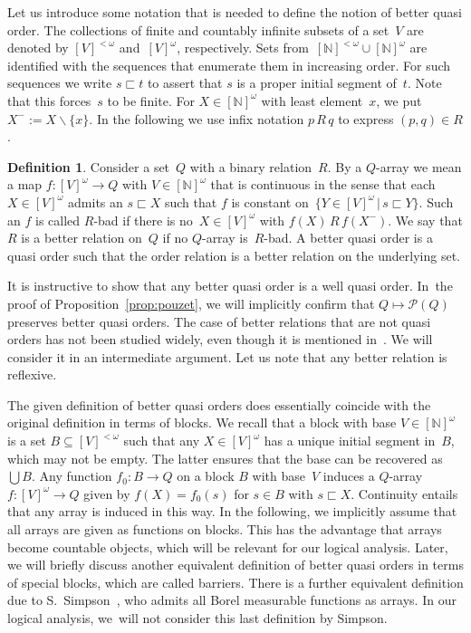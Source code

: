 \documentclass{amsart}
\numberwithin{theorem}{section}
\theoremstyle{definition}
\newtheorem{definition}[theorem]{Definition}
\begin{document}
Let us introduce some notation that is needed to define the notion of better quasi order. The collections of finite and countably infinite subsets of a set~$V$ are denoted by $[V]^{<\omega}$ and~$[V]^\omega$, respectively. Sets from~$[\mathbb N]^{<\omega}\cup[\mathbb N]^\omega$ are identified with the sequences that enumerate them in increasing order. For such sequences we write $s\sqsubset t$ to assert that $s$ is a proper initial segment of~$t$. Note that this forces~$s$ to be finite. For $X\in[\mathbb N]^\omega$ with least element~$x$, we put $X^-:=X\backslash\{x\}$. In the following we use infix notation $p\,R\,q$ to express $(p,q)\in R$.

\begin{definition}
Consider a set~$Q$ with a binary relation~$R$. By a $Q$-array we mean a map $f:[V]^\omega\to Q$ with $V\in[\mathbb N]^\omega$ that is continuous in the sense that each~$X\in[V]^\omega$ admits an $s\sqsubset X$ such that $f$ is constant on~$\{Y\in[V]^\omega\,|\,s\sqsubset Y\}$. Such an $f$ is called $R$-bad if there is no~$X\in[V]^\omega$ with $f(X)\,R\,f(X^-)$. We say that $R$ is a better relation on~$Q$ if no $Q$-array is~$R$-bad. A better quasi order is a quasi order such that the order relation is a better relation on the underlying set.
\end{definition}

It is instructive to show that any better quasi order is a well quasi order. In~the proof of Proposition~\ref{prop:pouzet}, we will implicitly confirm that $Q\mapsto\mathcal P(Q)$ preserves better quasi orders. The case of better relations that are not quasi orders has not been studied widely, even though it is mentioned in~\cite{pouzet-better-relation,shelah-bqo}. We will consider it in an intermediate argument. Let us note that any better relation is reflexive.

The given definition of better quasi orders does essentially coincide with the original definition in terms of blocks. We recall that a block with base $V\in[\mathbb N]^\omega$ is a set $B\subseteq[V]^{<\omega}$ such that any $X\in[V]^\omega$ has a unique initial segment in~$B$, which may not be empty. The latter ensures that the base can be recovered as $\bigcup B$. Any function $f_0:B\to Q$ on a block $B$ with base~$V$ induces a $Q$-array $f:[V]^\omega\to Q$ given by $f(X)=f_0(s)$ for $s\in B$ with $s\sqsubset X$. Continuity entails that any array is induced in this way. In the following, we implicitly assume that all arrays are given as functions on blocks. This has the advantage that arrays become countable objects, which will be relevant for our logical analysis. Later, we will briefly discuss another equivalent definition of better quasi orders in terms of special blocks, which are called barriers. There is a further equivalent definition due to S.~Simpson~\cite{simpson-borel-bqos}, who admits all Borel measurable functions as arrays. In our logical analysis, we~will not consider this last definition by Simpson.
\end{document}
